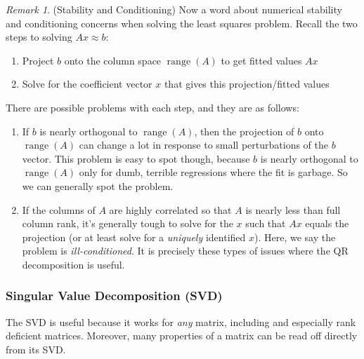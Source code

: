 \documentclass[12pt]{article}
\numberwithin{equation}{section} %
\theoremstyle{plain}
\newtheorem{prop}[thm]{Proposition}
\theoremstyle{definition}
\theoremstyle{remark}
\newtheorem*{rmk}{Remark}
\newcommand{\Rm}{\mathbb{R}^m}
\newcommand{\Rmn}{\mathbb{R}^{m\times n}}
\newcommand{\range}{\operatorname{range}}
\begin{document}
\begin{rmk}({Stability and Conditioning})
Now a word about numerical stability and conditioning concerns when
solving the least squares problem. Recall the two steps to solving
$Ax\approx b$:
\begin{enumerate}[label=(\roman*)]
  \item Project $b$ onto the column space $\range(A)$ to get fitted
    values $Ax$
  \item Solve for the coefficient vector $x$ that gives this
    projection/fitted values
\end{enumerate}
There are possible problems with each step, and they are as follows:
\begin{enumerate}[label=(\roman*)]
  \item
    If $b$ is nearly orthogonal to $\range(A)$, then the projection of
    $b$ onto $\range(A)$ can change a lot in response to small
    perturbations of the $b$ vector. This problem is easy to spot
    though, because $b$ is nearly orthogonal to $\range(A)$ only for
    dumb, terrible regressions where the fit is garbage. So we can
    generally spot the problem.
  \item If the columns of $A$ are highly correlated so that $A$ is
    nearly less than full column rank, it's generally tough to solve for
    the $x$ such that $Ax$ equals the projection (or at least solve for
    a \emph{uniquely} identified $x$). Here, we say the problem is
    \emph{ill-conditioned}. It is precisely these types of issues where
    the QR decomposition is useful.
\end{enumerate}
\end{rmk}




\clearpage
\subsubsection{Singular Value Decomposition (SVD)}

The SVD is  useful because it works for \emph{any} matrix, including and
especially rank deficient matrices. Moreover, many properties of a
matrix can be read off directly from its SVD.
\end{document}
